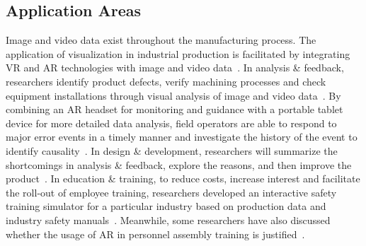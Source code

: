 \documentclass[a4paper,fleqn]{cas-dc}
\begin{document}
\subsection{Application Areas}
Image and video data exist throughout the manufacturing process. The application of visualization in industrial production is facilitated by integrating VR and AR technologies with image and video data~\cite{hamid2014virtual,Satkowski2021}. 
In analysis \& feedback, researchers identify product defects, verify machining processes and check equipment installations through visual analysis of image and video data~\cite{Cirp2019,Murithi2020,tao2020machining}. 
By combining an AR headset for monitoring and guidance with a portable tablet device for more detailed data analysis, field operators are able to respond to major error events in a timely manner and investigate the history of the event to identify causality~\cite{Becher2022,Murithi2020,North2021,Satkowski2021}.
In design \& development, researchers will summarize the shortcomings in analysis \& feedback, explore the reasons, and then improve the product~\cite{Townsend2022}.
In education \& training, to reduce costs, increase interest and facilitate the roll-out of employee training, researchers developed an interactive safety training simulator for a particular industry based on production data and industry safety manuals~\cite{Moreland2019,Pantforder2009}. Meanwhile, some researchers have also discussed whether the usage of AR in personnel assembly training is justified~\cite{buttner2020augmented}.


\end{document}
